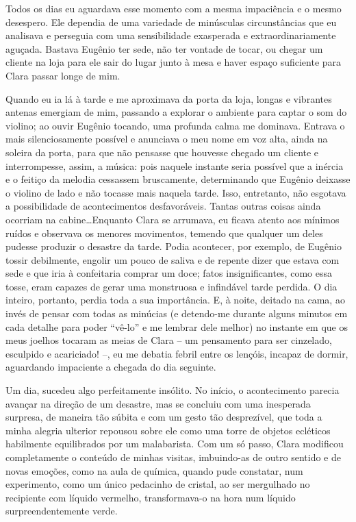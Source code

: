 Todos os dias eu aguardava esse momento com a mesma impaciência e o mesmo desespero. Ele dependia de uma variedade de minúsculas circunstâncias que eu analisava e perseguia com uma sensibilidade exasperada e extraordinariamente aguçada. Bastava Eugênio ter sede, não ter vontade de tocar, ou chegar um cliente na loja para ele sair do lugar junto à mesa e haver espaço suficiente para Clara passar longe de mim.

Quando eu ia lá à tarde e me aproximava da porta da loja, longas e vibrantes antenas emergiam de mim, passando a explorar o ambiente para captar o som do violino; ao ouvir Eugênio tocando, uma profunda calma me dominava. Entrava o mais silenciosamente possível e anunciava o meu nome em voz alta, ainda na soleira da porta, para que não pensasse que houvesse chegado um cliente e interrompesse, assim, a música: pois naquele instante seria possível que a inércia e o feitiço da melodia cessassem bruscamente, determinando que Eugênio deixasse o violino de lado e não tocasse mais naquela tarde. Isso, entretanto, não esgotava a possibilidade de acontecimentos desfavoráveis. Tantas outras coisas ainda ocorriam na cabine\dots Enquanto Clara se arrumava, eu ficava atento aos mínimos ruídos e observava os menores movimentos, temendo que qualquer um deles pudesse produzir o desastre da tarde. Podia acontecer, por exemplo, de Eugênio tossir debilmente, engolir um pouco de saliva e de repente dizer que estava com sede e que iria à confeitaria comprar um doce; fatos insignificantes, como essa tosse, eram capazes de gerar uma monstruosa e infindável tarde perdida. O dia inteiro, portanto, perdia toda a sua importância. E, à noite, deitado na cama, ao invés de pensar com todas as minúcias (e detendo-me durante alguns minutos em cada detalhe para poder ``vê-lo'' e me lembrar dele melhor) no instante em que os meus joelhos tocaram as meias de Clara -- um pensamento para ser cinzelado, esculpido e acariciado! --, eu me debatia febril entre os lençóis, incapaz de dormir, aguardando impaciente a chegada do dia seguinte.

Um dia, sucedeu algo perfeitamente insólito. No início, o acontecimento parecia avançar na direção de um desastre, mas se concluiu com uma inesperada surpresa, de maneira tão súbita e com um gesto tão desprezível, que toda a minha alegria ulterior repousou sobre ele como uma torre de objetos ecléticos habilmente equilibrados por um malabarista.
Com um só passo, Clara modificou completamente o conteúdo de minhas visitas, imbuindo-as de outro sentido e de novas emoções, como na aula de química, quando pude constatar, num experimento, como um único pedacinho de cristal, ao ser mergulhado no recipiente com líquido vermelho, transformava-o na hora num líquido surpreendentemente verde.

